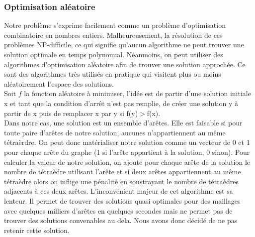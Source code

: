 \documentclass[a4paper,11pt,openany]{article}
\begin{document}
\subsubsection{Optimisation aléatoire}
\noindent
Notre problème s'exprime facilement comme un problème d'optimisation combinatoire en nombres entiers. Malheureusement, la résolution de ces problèmes NP-difficile, ce qui signifie qu'aucun algorithme ne peut trouver une solution optimale en temps polynomial. Néanmoins, on peut utiliser des algorithmes d'optimisation aléatoire afin de trouver une solution approchée. Ce sont des algorithmes très utilisés en pratique qui visitent plus ou moins aléatoirement l'espace des solutions.\\
Soit $f$ la fonction aléatoire à minimiser, l'idée est de partir d'une solution initiale x et tant que la condition d'arrêt n'est pas remplie, de créer une solution y à partir de x puis de remplacer x par y si f(y)$>$f(x).\\
Dans notre cas, une solution est un ensemble d'arêtes. Elle est faisable si pour toute paire d'arêtes de notre solution, aucunes n'appartiennent au même tétraèrdre. On peut donc matérialiser notre solution comme un vecteur de 0 et 1 pour chaque arête du graphe (1 si l'arête appartient à la solution, 0 sinon). Pour calculer la valeur de notre solution, on ajoute pour chaque arête de la solution le nombre de tétraèdre utilisant l'arête et si deux arêtes appartiennent au même tétraèdre alors on inflige une pénalité en soustrayant le nombre de tétraèdres adjacents à ces deux arêtes. L'inconvénient majeur de cet algorithme est sa lenteur. Il permet de trouver des solutions quasi optimales pour des maillages avec quelques milliers d'arêtes en quelques secondes mais ne permet pas de trouver des solutions convenables au dela. Nous avons donc décidé de ne pas retenir cette solution.
\end{document}
